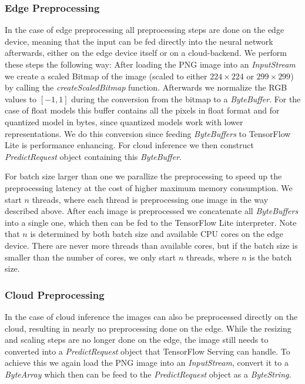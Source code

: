 \subsubsection{Edge Preprocessing}
\label{chap:preproImpl}
In the case of edge preprocessing all preprocessing steps are done on the edge device, meaning that the input can be fed directly into the neural network afterwards, either on the edge device itself or on a cloud-backend.
We perform these steps the following way: After loading the PNG image into an \emph{InputStream} we create a scaled Bitmap of the image (scaled to either $224\times224$ or $299\times299$) by calling the \emph{createScaledBitmap} function. 
Afterwards we normalize the RGB values to $[-1,1]$ during the conversion from the bitmap to a \emph{ByteBuffer}. 
For the case of float models this buffer contains all the pixels in float format and for quantized model in bytes, since quantized models work with lower representations.
We do this conversion since feeding \emph{ByteBuffers} to TensorFlow Lite is performance enhancing. %
For cloud inference we then construct \emph{PredictRequest} object containing this \emph{ByteBuffer}.

For batch size larger than one we parallize the preprocessing to speed up the preprocessing latency at the cost of higher maximum memory consumption. We start $n$ threads, where each thread is preprocessing one image in the way described above. After each image is preprocessed we concatenate all \emph{ByteBuffers} into a single one, which then can be fed to the TensorFlow Lite interpreter. Note that $n$ is determined by both batch size and available CPU cores on the edge device. There are never more threads than available cores, but if the batch size is smaller than the number of cores, we only start $n$ threads, where $n$ is the batch size. 

\subsubsection{Cloud Preprocessing}

In the case of cloud inference the images can also be preprocessed directly on the cloud, resulting in nearly no preprocessing done on the edge. While the resizing and scaling steps are no longer done on the edge, the image still needs to converted into a \emph{PredictRequest} object that TensorFlow Serving can handle.
To achieve this we again load the PNG image into an \emph{InputStream}, convert it to a \emph{ByteArray} which then can be feed to the \emph{PredictRequest} object as a \emph{ByteString}. 

